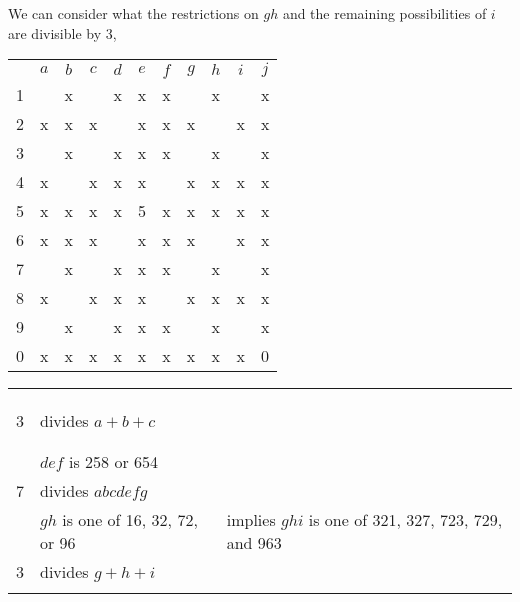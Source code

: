 We can consider what the restrictions on $gh$ and the remaining possibilities of $i$ are divisible by 3,
\begin{center}
\begin{tabular}{ccccccccccc}
			&	$a$	&	$b$	&	$c$	&	$d$	&	$e$	&	$f$	&	$g$	&	$h$	&	$i$	&	$j$	\\
	1		&		&	x	&		&	x	&	x	&	x	&		&	x	&		&	x	\\
	2		&	x	&	x	&	x	&		&	x	&	x	&	x	&		&	x	&	x	\\
	3		&		&	x	&		&	x	&	x	&	x	&		&	x	&		&	x	\\
	4		&	x	&		&	x	&	x	&	x	&		&	x	&	x	&	x	&	x	\\
	5		&	x	&	x	&	x	&	x	&	5	&	x	&	x	&	x	&	x	&	x	\\
	6		&	x	&	x	&	x	&		&	x	&	x	&	x	&		&	x	&	x	\\
	7		&		&	x	&		&	x	&	x	&	x	&		&	x	&		&	x	\\
	8		&	x	&		&	x	&	x	&	x	&		&	x	&	x	&	x	&	x	\\
	9		&		&	x	&		&	x	&	x	&	x	&		&	x	&		&	x	\\
	0		&	x	&	x	&	x	&	x	&	x	&	x	&	x	&	x	&	x	&	0	\\
\end{tabular}
\hspace{1cm}\vline\hspace{1cm}
\begin{tabular}{rll}
	& 		\\
	& 		\\
	& 		\\
	3	&	divides $a+b+c$		\\
	& 		\\
	&		\\
	&	$def$ is 258 or 654		\\
	7	&	divides $abcdefg$	\\
		&	$gh$ is one of 16, 32, 72, or 96 & implies $ghi$ is one of 321, 327, 723, 729, and 963 \\
	3	&	divides $g+h+i$		\\
		&	
\end{tabular}
\end{center}

